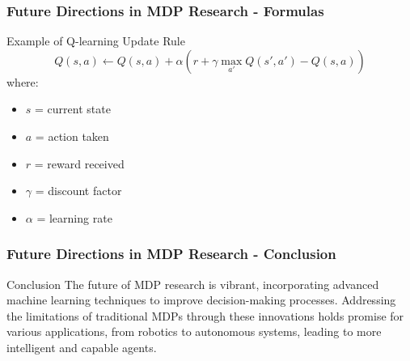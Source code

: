 \documentclass[aspectratio=169]{beamer}
\begin{document}
\begin{frame}[fragile]
    \frametitle{Future Directions in MDP Research - Formulas}
    \begin{block}{Example of Q-learning Update Rule}
        \begin{equation}
            Q(s, a) \leftarrow Q(s, a) + \alpha \left( r + \gamma \max_{a'} Q(s', a') - Q(s, a) \right) 
        \end{equation}
        where:  
        \begin{itemize}
            \item $s$ = current state  
            \item $a$ = action taken  
            \item $r$ = reward received  
            \item $\gamma$ = discount factor  
            \item $\alpha$ = learning rate  
        \end{itemize}
    \end{block}
\end{frame}

\begin{frame}[fragile]
    \frametitle{Future Directions in MDP Research - Conclusion}
    \begin{block}{Conclusion}
        The future of MDP research is vibrant, incorporating advanced machine learning techniques to improve decision-making processes.
        Addressing the limitations of traditional MDPs through these innovations holds promise for various applications, from robotics to autonomous systems, leading to more intelligent and capable agents.
    \end{block}
\end{frame}
\end{document}
